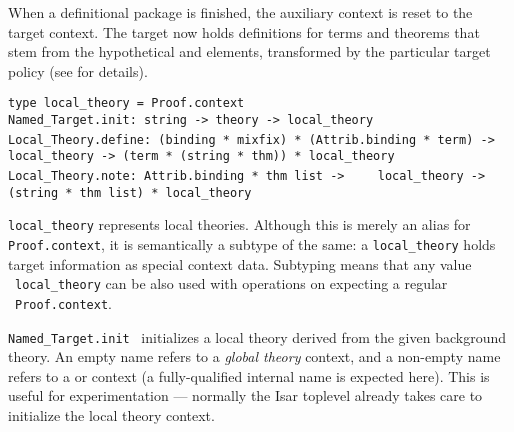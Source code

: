 \begin{isabellebody}
\begin{isamarkuptext}
  \noindent When a definitional package is finished, the auxiliary
  context is reset to the target context.  The target now holds
  definitions for terms and theorems that stem from the hypothetical
  \isa{{\isasymDEFINE}} and \isa{{\isasymNOTE}} elements, transformed by
  the particular target policy (see
  \cite[\S4--5]{Haftmann-Wenzel:2009} for details).%
\end{isamarkuptext}%
\isamarkuptrue%
%
\isadelimmlref
%
\endisadelimmlref
%
\isatagmlref
%
\begin{isamarkuptext}%
\begin{mldecls}
  \verb|type local_theory = Proof.context| \\
  \verb|Named_Target.init: string -> theory -> local_theory| \\[1ex]
  \verb|Local_Theory.define: (binding * mixfix) * (Attrib.binding * term) ->|\isasep\isanewline%
\verb|    local_theory -> (term * (string * thm)) * local_theory| \\
  \verb|Local_Theory.note: Attrib.binding * thm list ->|\isasep\isanewline%
\verb|    local_theory -> (string * thm list) * local_theory| \\
  \end{mldecls}

  \begin{description}

  \item \verb|local_theory| represents local theories.  Although
  this is merely an alias for \verb|Proof.context|, it is
  semantically a subtype of the same: a \verb|local_theory| holds
  target information as special context data.  Subtyping means that
  any value ~\verb|local_theory| can be also used
  with operations on expecting a regular ~\verb|Proof.context|.

  \item \verb|Named_Target.init|~ initializes a local
  theory derived from the given background theory.  An empty name
  refers to a \emph{global theory} context, and a non-empty name
  refers to a \hyperlink{command.locale}{\mbox{}} or \hyperlink{command.class}{\mbox{}} context (a
  fully-qualified internal name is expected here).  This is useful for
  experimentation --- normally the Isar toplevel already takes care to
  initialize the local theory context.


\end{description}
\end{isamarkuptext}
\end{isabellebody}
